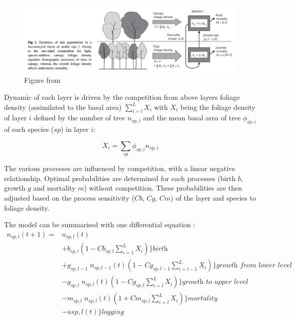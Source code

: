 \documentclass{article}
\begin{document}
\begin{figure}[h]
    \centering
    \includegraphics[width=\textwidth]{Figure/Fig_model_Kohyama.png}
    \caption{Figure from ~\autocite{kohyamaOnesidedCompetitionLight2012}}
    \label{fig:fig_model}
\end{figure}

Dynamic of each layer is driven by the competition from above layers foliage density (assimilated to the basal area) $\sum_{i = l}^{L} X_i$ with $X_i$ being the foliage density of layer $i$ defined by the number of tree $n_{sp,i}$ and the mean basal area of tree $\phi_{sp,i}$ of each species ($sp$) in layer $i$:

\begin{equation}
    X_{i} = \sum_{sp} \phi_{sp,i} n_{sp,i}
\end{equation}

The various processes are influenced by competition, with a linear negative relationship. Optimal probabilities are determined for each processes (birth $b$, growth $g$ and mortality $m$) without competition. These probabilities are then adjusted based on the process sensitivity ($Cb$, $Cg$, $Cm$) of the layer and species to foliage density.

\noindent The model can be summarised with one differential equation : \\
\begin{equation}\label{eq:model_general}
    \begin{split}
    n_{sp,l}(t+1) = & n_{sp,l}(t) \\
    & + b_{sp,l} (1 - Cb_{sp,l} \sum_{i = 1}^{L} X_{i}) \} \textit{birth} \\
    & + g_{sp,l - 1} \; n_{sp,l-1}(t) (1 - Cg_{sp,l-1} \sum_{i = l-1}^{L} X_{i}) \} \textit{growth from lower level}\\
    & - g_{sp,l} \; n_{sp,l}(t) (1 - Cg_{sp,l} \sum_{i = l}^{L} X_{i}) \} \textit{growth to upper level}\\
    & - m_{sp,l} \; n_{sp,l}(t) (1 + Cm_{sp,l} \sum_{i = l}^{L} X_{i}) \} \textit{mortality} \\
    & - u{sp, l}(t) \} \textit{logging}
    \end{split}
\end{equation}
\end{document}
